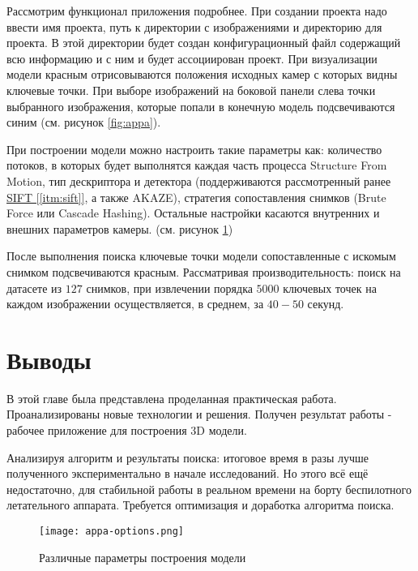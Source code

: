 Рассмотрим функционал приложения подробнее. При создании проекта надо ввести имя проекта, путь к директории с изображениями и директорию для проекта. В этой директории будет создан конфигурационный файл содержащий всю информацию и с ним и будет ассоциирован проект. При визуализации модели красным отрисовываются положения исходных камер с которых видны ключевые точки. При выборе изображений на боковой панели слева точки выбранного изображения, которые попали в конечную модель подсвечиваются синим (см. рисунок \ref{fig:appa}).

При построении модели можно настроить такие параметры как: количество потоков, в которых будет выполнятся каждая часть процесса Structure From Motion, тип дескриптора и детектора (поддерживаются рассмотренный ранее \hyperref[itm:sift]{SIFT [\ref{itm:sift}]}, а также AKAZE), стратегия сопоставления снимков (Brute Force или Cascade Hashing). Остальные настройки касаются внутренних и внешних параметров камеры. (см. рисунок \ref{fig:appa-options})

После выполнения поиска ключевые точки модели сопоставленные с искомым снимком подсвечиваются красным. Рассматривая производительность: поиск на датасете из $127$ снимков, при извлечении порядка $5000$ ключевых точек на каждом изображении осуществляется, в среднем, за $40-50$ секунд.

\section{Выводы}

В этой главе была представлена проделанная практическая работа. Проанализированы новые технологии и решения. Получен результат работы - рабочее приложение для построения 3D модели.

Анализируя алгоритм и результаты поиска: итоговое время в разы лучше полученного экспериментально в начале исследований. Но этого всё ещё недостаточно, для стабильной работы в реальном времени на борту беспилотного летательного аппарата. Требуется оптимизация и доработка алгоритма поиска.

\begin{figure}[h]
    \centering
    \texttt{[image: appa-options.png]}
    \caption{Различные параметры построения модели}
    \label{fig:appa-options}
\end{figure}
